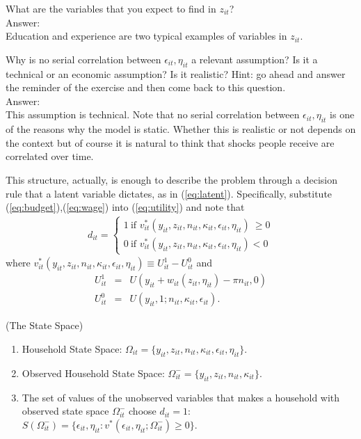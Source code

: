 \begin{exercise}
What are the variables that you expect to find in $z_{it}$?\\
\noindent Answer:\\
\noindent Education and experience are two typical examples of variables in $z_{it}$.
\end{exercise}

\begin{exercise}
Why is no serial correlation between $\epsilon_{it}, \eta_{it}$ a relevant assumption? Is it a technical or an economic assumption? Is it realistic? Hint: go ahead and answer the reminder of the exercise and then come back to this question.\\
\noindent Answer:\\
\noindent This assumption is technical. Note that no serial correlation between $\epsilon_{it}, \eta_{it}$ is one of the reasons why the model is static. Whether this is realistic or not depends on the context but of course it is natural to think that shocks people receive are correlated over time. 
\end{exercise}

\indent This structure, actually, is enough to describe the problem through a decision rule that a latent variable dictates, as in (\ref{eq:latent}). Specifically, substitute (\ref{eq:budget}),(\ref{eq:wage}) into (\ref{eq:utility}) and note that
\begin{eqnarray}
d_{it} =
\begin{cases}
1 \  \text{if }  v_{it}^* \left( y_{it}, z_{it}, n_{it}, \kappa_{it}, \epsilon_{it}, \eta_{it} \right) \ \geq 0  \\
0 \  \text{if }  v_{it}^* \left( y_{it}, z_{it}, n_{it}, \kappa_{it}, \epsilon_{it}, \eta_{it} \right)  < 0 \label{eq:latent2}
\end{cases}
\end{eqnarray}
where $v_{it}^* \left( y_{it}, z_{it}, n_{it}, \kappa_{it}, \epsilon_{it}, \eta_{it} \right) \equiv U_{it}^1 - U_{it}^0$ and
\begin{eqnarray}
U_{it}^1 &=& U(y_{it} + w_{it}(z_{it}, \eta_{it}) - \pi n_{it}, 0) \\
U_{it}^0 &=& U(y_{it}, 1; n_{it}, \kappa_{it}, \epsilon_{it}).
\end{eqnarray}

\begin{definition} (The State Space)
\begin{enumerate}
\item Household State Space: $\Omega_{it} = \{ y_{it}, z_{it}, n_{it}, \kappa_{it}, \epsilon_{it}, \eta_{it} \}$.
\item Observed Household State Space: $\Omega_{it}^- = \{ y_{it}, z_{it}, n_{it}, \kappa_{it} \}$.
\item The set of values of the unobserved variables that makes a household with observed state space $\Omega_{it}^-$ choose $d_{it} = 1$: $S \left(  \Omega_{it}^- \right) = \{ \epsilon_{it}, \eta_{it}:  v^* \left(\epsilon_{it}, \eta_{it} ; \Omega_{it}^- \right) \geq 0 \}$. 
\end{enumerate}
\end{definition}

